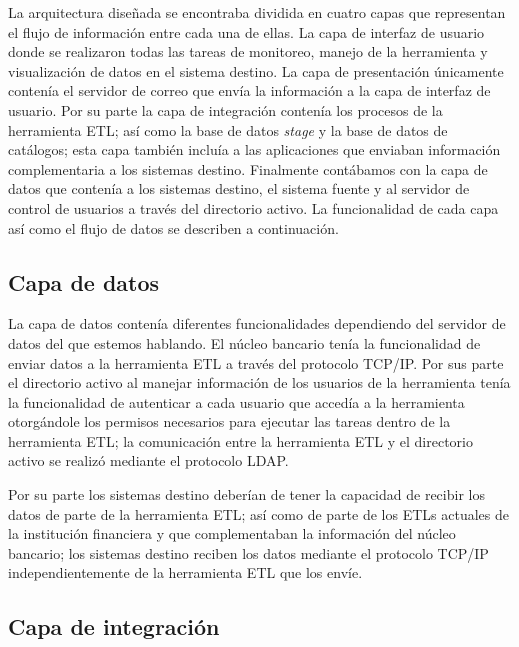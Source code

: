 La arquitectura diseñada se encontraba dividida en cuatro capas que representan
el flujo de información entre cada una de ellas. La capa de interfaz de usuario
donde se realizaron todas las tareas de monitoreo, manejo de la herramienta y
visualización de datos en el sistema destino. La capa de presentación únicamente
contenía el servidor de correo que envía la información a la capa de interfaz de
usuario. Por su parte la capa de integración contenía los procesos de la
herramienta ETL; así como la base de datos \emph{stage} y la base de datos de
catálogos; esta capa también incluía a las aplicaciones que enviaban información
complementaria a los sistemas destino. Finalmente contábamos con la capa de
datos que contenía a los sistemas destino, el sistema fuente y al servidor de
control de usuarios a través del directorio activo. La funcionalidad de cada
capa así como el flujo de datos se describen a continuación.

\subsection{Capa de datos}

La capa de datos contenía diferentes funcionalidades dependiendo del servidor de
datos del que estemos hablando. El núcleo bancario tenía la funcionalidad de
enviar datos a la herramienta ETL a través del protocolo TCP/IP. Por sus parte
el directorio activo al manejar información de los usuarios de la herramienta
tenía la funcionalidad de autenticar a cada usuario que accedía a la herramienta
otorgándole los permisos necesarios para ejecutar las tareas dentro de la
herramienta ETL; la comunicación entre la herramienta ETL y el directorio activo
se realizó mediante el protocolo LDAP.

Por su parte los sistemas destino deberían de tener la capacidad de recibir los
datos de parte de la herramienta ETL; así como de parte de los ETLs actuales de
la institución financiera y que complementaban la información del núcleo
bancario; los sistemas destino reciben los datos mediante el protocolo TCP/IP
independientemente de la herramienta ETL que los envíe.

\subsection{Capa de integración}

